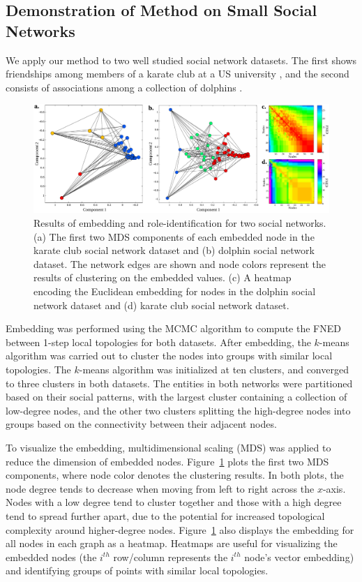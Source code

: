 \documentclass{article}
\begin{document}
\subsection{Demonstration of Method on Small Social Networks}
We apply our method to two well studied social network datasets. The first shows friendships among members of a karate club at a US university \cite{zachary1977information}, and the second consists of associations among a collection of dolphins \cite{bottleNoseDolphinPeople}.
\begin{figure}[h!tbp]
  \centering               
  \includegraphics[width=1\textwidth]{fig/fig3.pdf}
  \caption{Results of embedding and role-identification for two social networks. (a) The first two MDS components of each embedded node in the karate club social network dataset and (b) dolphin social network dataset. The network edges are shown and node colors represent the results of clustering on the embedded values. (c) A heatmap encoding the Euclidean embedding for nodes in the dolphin social network dataset and (d) karate club social network dataset.}
  \label{fig:smallSocialNetwork}
\end{figure}

Embedding was performed using the MCMC algorithm to compute the FNED between 1-step local topologies for both datasets. After embedding, the $k$-means algorithm was carried out to cluster the nodes into groups with similar local topologies. The $k$-means algorithm was initialized at ten clusters, and converged to three clusters in both datasets. The entities in both networks were partitioned based on their social patterns, with the largest cluster containing a collection of low-degree nodes, and the other two clusters splitting the high-degree nodes into groups based on the connectivity between their adjacent nodes.

To visualize the embedding, multidimensional scaling (MDS) was applied to reduce the dimension of embedded nodes. Figure~\ref{fig:smallSocialNetwork} plots the first two MDS components, where node color denotes the clustering results. In both plots, the node degree tends to decrease when moving from left to right across the $x$-axis. Nodes with a low degree tend to cluster together and those with a high degree tend to spread further apart, due to the potential for increased topological complexity around higher-degree nodes. Figure~\ref{fig:smallSocialNetwork} also displays the embedding for all nodes in each graph as a heatmap. Heatmaps are useful for visualizing the embedded nodes (the $i^{th}$ row/column represents the $i^{th}$ node's vector embedding) and identifying groups of points with similar local topologies.
\end{document}
